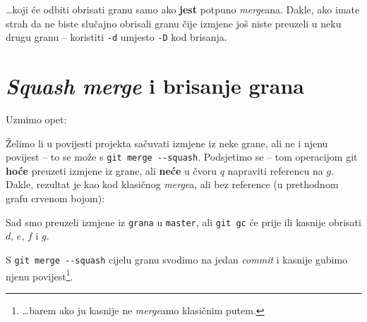 
\dots{}koji će odbiti obrisati granu samo ako \textbf{jest} potpuno \emph{merge}ana.
Dakle, ako imate strah da ne biste slučajno obrisali granu čije izmjene još niste preuzeli u neku drugu granu -- koristiti \verb+-d+ umjesto \verb+-D+ kod brisanja.

\section*{\emph{Squash merge} i brisanje grana}

Uzmimo opet:



Želimo li u povijesti projekta sačuvati izmjene iz neke grane, ali ne i njenu povijest -- to se može s \verb+git merge --squash+.
Podsjetimo se -- tom operacijom git \textbf{hoće} preuzeti izmjene iz grane, ali \textbf{neće} u čvoru $q$ napraviti referencu na $g$.
Dakle, rezultat je kao kod klasičnog \emph{merge}a, ali bez reference (u prethodnom grafu crvenom bojom):



Sad smo preuzeli izmjene iz \verb+grana+ u \verb+master+, ali \verb+git gc+ će prije ili kasnije obrisati $d$, $e$, $f$ i $g$.

S \verb+git merge --squash+ cijelu granu svodimo na jedan \emph{commit} i kasnije gubimo njenu povijest\footnote{\dots{}barem ako ju kasnije ne \emph{merge}amo klasičnim putem.}.
